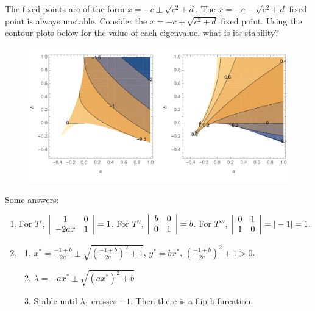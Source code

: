 \documentclass[12pt,letterpaper,noanswers]{exam}
\begin{document}
\begin{questions}
\begin{parts}
The fixed points are of the form $x = -c \pm \sqrt{c^2 + d}$.  The $ x = -c - \sqrt{c^2 + d}$ fixed point is always unstable.
Consider the $x = -c + \sqrt{c^2 + d}$ fixed point.  Using the contour plots below for the value of each eigenvalue, what is its stability?
\begin{figure}[h]
\includegraphics[scale=0.4]{img/C26henon2.pdf}
\end{figure}
\end{parts}
\end{questions}

Some answers:
\begin{enumerate}
\item For $T'$, $\left\vert \begin{array}{c c} 1 & 0 \\ -2 a x & 1 \end{array} \right\vert = 1$.  For $T''$, 
 $\left\vert \begin{array}{c c} b & 0 \\ 0 & 1 \end{array} \right\vert = b$.
 For $T'''$, $\left\vert \begin{array}{c c} 0 & 1 \\ 1 & 0 \end{array} \right\vert = \vert -1 \vert = 1.$

\item 
\begin{enumerate}
\item $x^* = \frac{-1+b}{2a} \pm \sqrt{\left(\frac{-1+b}{2a}\right)^2 +1}$, $y^* = bx^*$, $\left(\frac{-1+b}{2a}\right)^2 +1>0$.
\item $\lambda = -ax^* \pm \sqrt{(ax^*)^2+b}$
\item Stable until $\lambda_1$ crosses $-1$.  Then there is a flip bifurcation.
\end{enumerate}
\end{enumerate}
\end{document}
